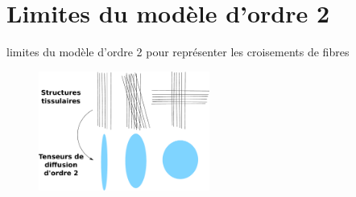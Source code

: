 % 


\section{Limites du modèle d'ordre 2}
limites du modèle d'ordre 2 pour représenter les croisements de fibres


\begin{figure}[ht]
    \centering
    \includegraphics[width=0.5\textwidth]{Images/limite_tenseur.pdf}
    \caption{\label{fig:limite_tenseur}}
\end{figure}